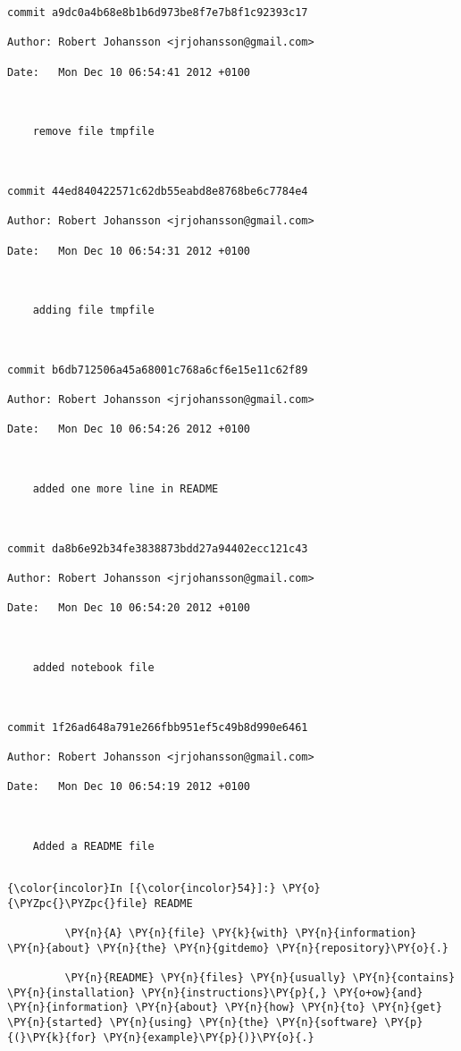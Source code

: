     \begin{Verbatim}[commandchars=\\\{\}]
commit a9dc0a4b68e8b1b6d973be8f7e7b8f1c92393c17

Author: Robert Johansson <jrjohansson@gmail.com>

Date:   Mon Dec 10 06:54:41 2012 +0100



    remove file tmpfile



commit 44ed840422571c62db55eabd8e8768be6c7784e4

Author: Robert Johansson <jrjohansson@gmail.com>

Date:   Mon Dec 10 06:54:31 2012 +0100



    adding file tmpfile



commit b6db712506a45a68001c768a6cf6e15e11c62f89

Author: Robert Johansson <jrjohansson@gmail.com>

Date:   Mon Dec 10 06:54:26 2012 +0100



    added one more line in README



commit da8b6e92b34fe3838873bdd27a94402ecc121c43

Author: Robert Johansson <jrjohansson@gmail.com>

Date:   Mon Dec 10 06:54:20 2012 +0100



    added notebook file



commit 1f26ad648a791e266fbb951ef5c49b8d990e6461

Author: Robert Johansson <jrjohansson@gmail.com>

Date:   Mon Dec 10 06:54:19 2012 +0100



    Added a README file


    \end{Verbatim}







    \begin{Verbatim}[commandchars=\\\{\}]
{\color{incolor}In [{\color{incolor}54}]:} \PY{o}{\PYZpc{}\PYZpc{}file} README
         
         \PY{n}{A} \PY{n}{file} \PY{k}{with} \PY{n}{information} \PY{n}{about} \PY{n}{the} \PY{n}{gitdemo} \PY{n}{repository}\PY{o}{.}
         
         \PY{n}{README} \PY{n}{files} \PY{n}{usually} \PY{n}{contains} \PY{n}{installation} \PY{n}{instructions}\PY{p}{,} \PY{o+ow}{and} \PY{n}{information} \PY{n}{about} \PY{n}{how} \PY{n}{to} \PY{n}{get} \PY{n}{started} \PY{n}{using} \PY{n}{the} \PY{n}{software} \PY{p}{(}\PY{k}{for} \PY{n}{example}\PY{p}{)}\PY{o}{.}
\end{Verbatim}

